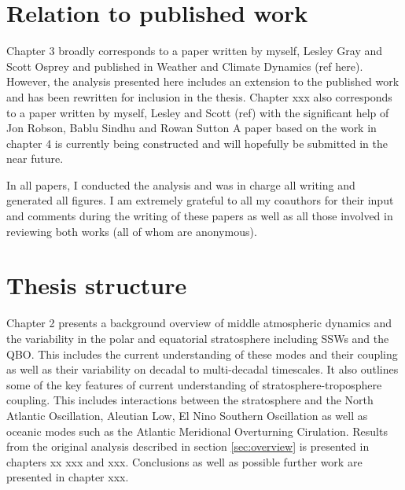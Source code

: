\section{Relation to published work}

Chapter 3 broadly corresponds to a paper written by myself, Lesley Gray and Scott Osprey and published in Weather and Climate Dynamics (ref here). However, the analysis presented here includes an extension to the published work and has been rewritten for inclusion in the thesis. Chapter xxx also corresponds to a paper written by myself, Lesley and Scott (ref) with the significant help of Jon Robson, Bablu Sindhu and Rowan Sutton A paper based on the work in chapter 4 is currently being constructed and will hopefully be submitted in the near future. 

In all papers, I conducted the analysis and was in charge all writing and generated all figures. I am extremely grateful to all my coauthors for their input and comments during the writing of these papers as well as all those involved in reviewing both works (all of whom are anonymous).  

\section{Thesis structure}
Chapter 2 presents a background overview of middle atmospheric dynamics and the variability in the polar and equatorial stratosphere including SSWs and the QBO. This includes the current understanding of these modes and their coupling as well as their variability on decadal to multi-decadal timescales. It also outlines some of the key features of current understanding of stratosphere-troposphere coupling. This includes interactions between the stratosphere and the North Atlantic Oscillation, Aleutian Low, El Nino Southern Oscillation as well as oceanic modes such as the Atlantic Meridional Overturning Cirulation. Results from the original analysis described in section \ref{sec:overview} is presented in chapters xx xxx and xxx. Conclusions as well as possible further work are presented in chapter xxx.










